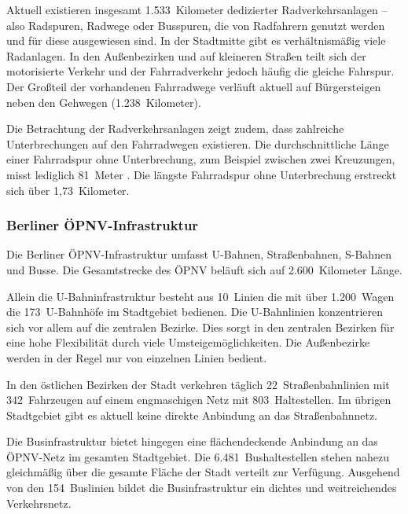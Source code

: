 Aktuell existieren insgesamt 1.533~Kilometer dedizierter Radverkehrsanlagen – also Radspuren, Radwege oder Busspuren, die von Radfahrern genutzt werden und für diese ausgewiesen sind. In der Stadtmitte gibt es verhältnismäßig viele Radanlagen. In den Außenbezirken und auf kleineren Straßen teilt sich der motorisierte Verkehr und der Fahrradverkehr jedoch häufig die gleiche Fahrspur. Der Großteil der vorhandenen Fahrradwege verläuft aktuell auf Bürgersteigen neben den Gehwegen (1.238~Kilometer).


Die Betrachtung der Radverkehrsanlagen zeigt zudem, dass zahlreiche Unterbrechungen auf den Fahrradwegen existieren. Die durchschnittliche Länge einer Fahrradspur ohne Unterbrechung, zum Beispiel zwischen zwei Kreuzungen, misst lediglich 81~Meter . Die längste Fahrradspur ohne Unterbrechung erstreckt sich über 1,73~Kilometer.

\subsubsection{Berliner ÖPNV-Infrastruktur}

Die Berliner ÖPNV-Infrastruktur umfasst U-Bahnen, Straßenbahnen, S-Bahnen und Busse. Die Gesamtstrecke des ÖPNV beläuft sich auf 2.600~Kilometer Länge.


Allein die U-Bahninfrastruktur besteht aus 10~Linien die mit über 1.200~Wagen die 173~U-Bahnhöfe im Stadtgebiet bedienen. Die U-Bahnlinien konzentrieren sich vor allem auf die zentralen Bezirke. Dies sorgt in den zentralen Bezirken für eine hohe Flexibilität durch viele Umsteigemöglichkeiten. Die Außenbezirke werden in der Regel nur von einzelnen Linien bedient.

In den östlichen Bezirken der Stadt verkehren täglich 22~Straßenbahnlinien mit 342~Fahrzeugen auf einem engmaschigen Netz mit 803~Haltestellen. Im übrigen Stadtgebiet gibt es aktuell keine direkte Anbindung an das Straßenbahnnetz.

Die Businfrastruktur bietet hingegen eine flächendeckende Anbindung an das ÖPNV-Netz im gesamten Stadtgebiet. Die 6.481~Bushaltestellen stehen nahezu gleichmäßig über die gesamte Fläche der Stadt verteilt zur Verfügung. Ausgehend von den 154~Buslinien bildet die Businfrastruktur ein dichtes und weitreichendes Verkehrsnetz.

